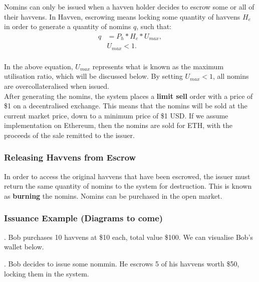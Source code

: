 \noindent Nomins can only be issued when a havven holder decides to escrow some or all of their havvens. In Havven, escrowing means locking some quantity of havvens $ H_e $ in order to generate a quantity of nomins $q$, such that:
\begin{align*}
q &= P_h * H_e * U_{max}, \\
& U_{max} < 1. \\
\end{align*}

\noindent In the above equation, $U_{max}$ represents what is known as the maximum utilisation ratio, which will be discussed below. By setting $U_{max} < 1 $, all nomins are overcollateralised when issued. \\

\noindent After generating the nomins, the system places a \textbf{limit sell} order with a price of \$1 on a decentralised exchange. This means that the nomins will be sold at the current market price, down to a minimum price of \$1 USD. If we assume implementation on Ethereum, then the nomins are sold for ETH, with the proceeds of the sale remitted to the issuer. \\

\subsubsection{Releasing Havvens from Escrow}

\noindent In order to access the original havvens that have been escrowed, the issuer must return the same quantity of nomins to the system for destruction. This is known as \textbf{burning} the nomins. Nomins can be purchased in the open market.

\newpage

\subsubsection{Issuance Example (Diagrams to come)}

. Bob purchases 10 havvens at \$10 each, total value \$100. We can visualise Bob's wallet below.

\begin{center}
\end{center}

. Bob decides to issue some nommin. He escrows 5 of his havvens worth \$50, locking them in the system. \\

